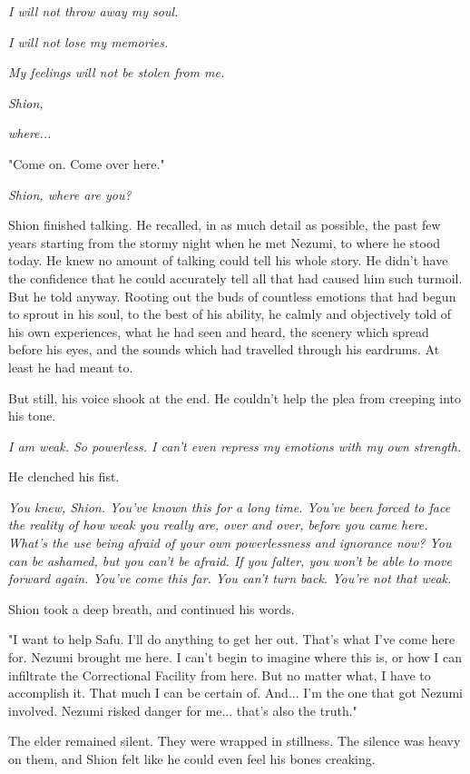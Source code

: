 \emph{I will not throw away my soul.}

\emph{I will not lose my memories.}

\emph{My feelings will not be stolen from me.}

\emph{Shion,}

\emph{where...}

"Come on. Come over here."

\emph{Shion, where are you?}

\myspace

Shion finished talking. He recalled, in as much detail as possible, the
past few years starting from the stormy night when he met Nezumi, to
where he stood today. He knew no amount of talking could tell his whole
story. He didn't have the confidence that he could accurately tell all
that had caused him such turmoil. But he told anyway. Rooting out the
buds of countless emotions that had begun to sprout in his soul, to the
best of his ability, he calmly and objectively told of his own
experiences, what he had seen and heard, the scenery which spread before
his eyes, and the sounds which had travelled through his eardrums. At
least he had meant to.

But still, his voice shook at the end. He couldn't help the plea from
creeping into his tone.

\emph{I am weak. So powerless. I can't even repress my emotions with my own
	strength.}

He clenched his fist.

\emph{You knew, Shion. You've known this for a long time. You've been forced
	to face the reality of how weak you really are, over and over, before
	you came here. What's the use being afraid of your own powerlessness and
	ignorance \emph{now}? You can be ashamed, but you can't be afraid. If you
	falter, you won't be able to move forward again. You've come this far.
	You can't turn back. You're not that weak.}

Shion took a deep breath, and continued his words.

"I want to help Safu. I'll do anything to get her out. That's what I've
come here for. Nezumi brought me here. I can't begin to imagine where
this is, or how I can infiltrate the Correctional Facility from here.
But no matter what, I have to accomplish it. That much I can be certain
of. And... I'm the one that got Nezumi involved. Nezumi risked danger
for me... that's also the truth."

The elder remained silent. They were wrapped in stillness. The silence
was heavy on them, and Shion felt like he could even feel his bones
creaking.

